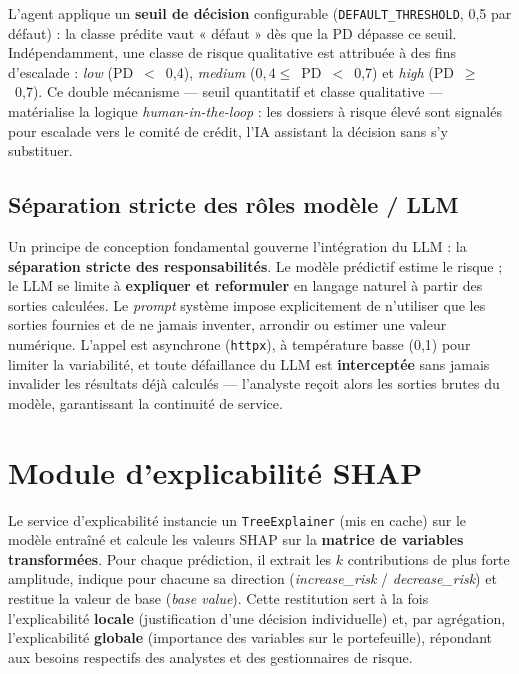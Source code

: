 L'agent applique un \textbf{seuil de décision} configurable (\texttt{DEFAULT\_THRESHOLD},
0{,}5 par défaut) : la classe prédite vaut « défaut » dès que la PD dépasse ce seuil.
Indépendamment, une classe de risque qualitative est attribuée à des fins d'escalade :
\textit{low} (PD~$<$~0{,}4), \textit{medium} ($0{,}4 \le$~PD~$<$~0{,}7) et
\textit{high} (PD~$\ge$~0{,}7). Ce double mécanisme — seuil quantitatif et classe
qualitative — matérialise la logique \textit{human-in-the-loop} : les dossiers à
risque élevé sont signalés pour escalade vers le comité de crédit, l'IA assistant la
décision sans s'y substituer.

\subsection{Séparation stricte des rôles modèle / LLM}

Un principe de conception fondamental gouverne l'intégration du LLM : la
\textbf{séparation stricte des responsabilités}. Le modèle prédictif estime le risque ;
le LLM se limite à \textbf{expliquer et reformuler} en langage naturel à partir des
sorties calculées. Le \textit{prompt} système impose explicitement de n'utiliser que
les sorties fournies et de ne jamais inventer, arrondir ou estimer une valeur
numérique. L'appel est asynchrone (\texttt{httpx}), à température basse (0{,}1) pour
limiter la variabilité, et toute défaillance du LLM est \textbf{interceptée} sans
jamais invalider les résultats déjà calculés — l'analyste reçoit alors les sorties
brutes du modèle, garantissant la continuité de service.

\section{Module d'explicabilité SHAP}

Le service d'explicabilité instancie un \texttt{TreeExplainer} (mis en cache) sur le
modèle entraîné et calcule les valeurs SHAP sur la \textbf{matrice de variables
transformées}. Pour chaque prédiction, il extrait les $k$ contributions de plus forte
amplitude, indique pour chacune sa direction (\textit{increase\_risk} /
\textit{decrease\_risk}) et restitue la valeur de base (\textit{base value}). Cette
restitution sert à la fois l'explicabilité \textbf{locale} (justification d'une
décision individuelle) et, par agrégation, l'explicabilité \textbf{globale}
(importance des variables sur le portefeuille), répondant aux besoins respectifs des
analystes et des gestionnaires de risque.

